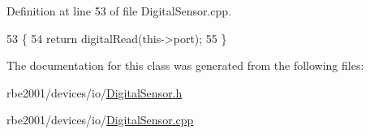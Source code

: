 Definition at line 53 of file Digital\+Sensor.\+cpp.


\begin{DoxyCode}
53                             \{
54     \textcolor{keywordflow}{return} digitalRead(this->port);
55 \}
\end{DoxyCode}


The documentation for this class was generated from the following files\+:\begin{DoxyCompactItemize}
\item 
rbe2001/devices/io/\hyperlink{_digital_sensor_8h}{Digital\+Sensor.\+h}\item 
rbe2001/devices/io/\hyperlink{_digital_sensor_8cpp}{Digital\+Sensor.\+cpp}\end{DoxyCompactItemize}
